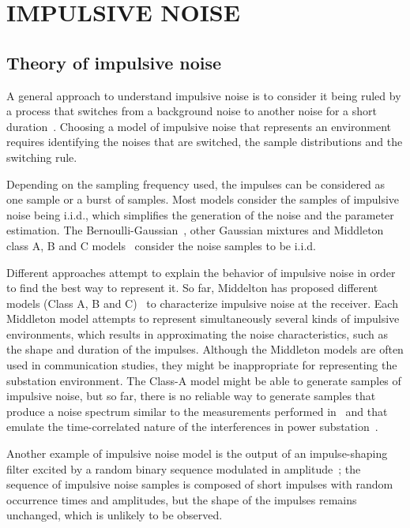 \documentclass[journal]{IEEEtran}
\begin{document}
\section{IMPULSIVE NOISE}

\subsection{Theory of impulsive noise}
A general approach to understand impulsive noise is to consider it being ruled by a process that switches from a background noise to another noise for a short duration~\cite{vaseghi}. Choosing a model of impulsive noise that represents an environment requires identifying the noises that are switched, the sample distributions and the switching rule.\

Depending on the sampling frequency used, the impulses can be considered as one sample or a burst of samples. Most models consider the samples of impulsive noise being i.i.d., which simplifies the generation of the noise and the parameter estimation. The Bernoulli-Gaussian~\cite{vaseghi}, other Gaussian mixtures and Middleton class A, B and C models~\cite{midd1} consider the noise samples to be i.i.d.\

Different approaches attempt to explain the behavior of impulsive noise in order to find the best way to represent it. So far, Middelton has proposed different models (Class A, B and C)~\cite{midd1} to characterize impulsive noise at the receiver. Each Middleton model attempts to represent simultaneously several kinds of impulsive environments, which results in approximating the noise characteristics, such as the shape and duration of the impulses. Although the Middleton models are often used in communication studies, they might be inappropriate for representing the substation environment. The Class-A model might be able to generate samples of impulsive noise, but so far, there is no reliable way to generate samples that produce a noise spectrum similar to the measurements performed in~\cite{taiwan,cigre} and that emulate the time-correlated nature of the interferences in power substation~\cite{cigre}.\

Another example of impulsive noise model is the output of an impulse-shaping filter excited by a random binary sequence modulated in amplitude~\cite{vaseghi}; the sequence of impulsive noise samples is composed of short impulses with random occurrence times and amplitudes, but the shape of the impulses remains unchanged, which is unlikely to be observed.\
\end{document}
